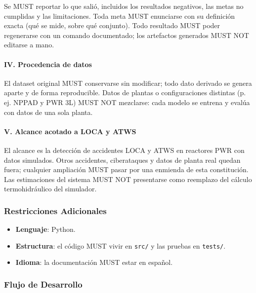 \documentclass[12pt,a4paper]{article}
\providecommand{\tightlist}{\setlength{\itemsep}{0pt}\setlength{\parskip}{0pt}}
\newenvironment{documentogenerado}[2]{%
  \def\doccomando{#1}\def\docruta{#2}%
  \par\begingroup\small\setstretch{1.15}\sloppy%
}{\endgroup\par\medskip}
\begin{document}
\begin{documentogenerado}{/speckit-constitution}{.specify\slash memory\slash constitution.md}
Se MUST reportar lo que salió, incluidos los resultados negativos, las metas no cumplidas y las
limitaciones. Toda meta MUST enunciarse con su definición exacta (qué se mide, sobre qué conjunto).
Todo resultado MUST poder regenerarse con un comando documentado; los artefactos generados MUST NOT
editarse a mano.

\paragraph{IV. Procedencia de datos}

El dataset original MUST conservarse sin modificar; todo dato derivado se genera aparte y de forma
reproducible. Datos de plantas o configuraciones distintas (p. ej. NPPAD y PWR 3L) MUST NOT mezclarse:
cada modelo se entrena y evalúa con datos de una sola planta.

\paragraph{V. Alcance acotado a LOCA y ATWS}

El alcance es la detección de accidentes LOCA y ATWS en reactores PWR con datos simulados. Otros
accidentes, ciberataques y datos de planta real quedan fuera; cualquier ampliación MUST pasar por
una enmienda de esta constitución. Las estimaciones del sistema MUST NOT presentarse como reemplazo
del cálculo termohidráulico del simulador.

\subsubsection{Restricciones Adicionales}

\begin{itemize}
\tightlist
\item
  \textbf{Lenguaje}: Python.
\item
  \textbf{Estructura}: el código MUST vivir en \texttt{src/} y las pruebas en \texttt{tests/}.
\item
  \textbf{Idioma}: la documentación MUST estar en español.
\end{itemize}

\subsubsection{Flujo de Desarrollo}


\end{documentogenerado}
\end{document}
